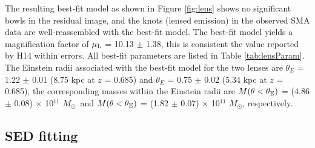 \documentclass[twocolumn,apj,numberedappendix]{emulateapj}
\newcommand{\Msun}{\mbox{$M_{\odot}$}}
\begin{document}
The resulting best-fit model as shown in Figure \ref{fig:lens} shows no significant bowls in the residual
image, and the knots (lensed emission) in the observed SMA data are well-reassembled with the best-fit model.
The best-fit model yields a magnification
factor of $\mu_{\rm L}$ = 10.13 $\pm$ 1.38, this is consistent the value reported by H14 within errors. All best-fit
parameters are listed in Table \ref{tab:lensParam}. The Einstein radii associated with the best-fit model for the two lenses are $\theta_{E}$ =
1.22 $\pm$ 0.01 (8.75 kpc at $z$ = 0.685) and $\theta_{E}$ = 0.75 $\pm$ 0.02 (5.34 kpc at $z$ = 0.685),
the corresponding masses within the Einstein radii are $M(\theta < \theta_{\rm E})$ = (4.86 $\pm$ 0.08) $\times$ 10$^{11}$ 
\Msun\ 
and $M(\theta < \theta_{\rm E})$ = (1.82 $\pm$ 0.07) $\times$ 10$^{11}$ \Msun, respectively. 


\subsection{SED fitting} \label{sec:SED}
\end{document}
